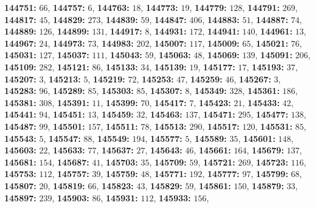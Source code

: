 \textsf{\bfseries 144751:} $66$, \textsf{\bfseries 144757:} $6$, \textsf{\bfseries 144763:} $18$, \textsf{\bfseries 144773:} $19$, \textsf{\bfseries 144779:} $128$, \textsf{\bfseries 144791:} $269$, \textsf{\bfseries 144817:} $45$, \textsf{\bfseries 144829:} $273$, \textsf{\bfseries 144839:} $59$, \textsf{\bfseries 144847:} $406$, \textsf{\bfseries 144883:} $51$, \textsf{\bfseries 144887:} $74$, \textsf{\bfseries 144889:} $126$, \textsf{\bfseries 144899:} $131$, \textsf{\bfseries 144917:} $8$, \textsf{\bfseries 144931:} $172$, \textsf{\bfseries 144941:} $140$, \textsf{\bfseries 144961:} $13$, \textsf{\bfseries 144967:} $24$, \textsf{\bfseries 144973:} $73$, \textsf{\bfseries 144983:} $202$, \textsf{\bfseries 145007:} $117$, \textsf{\bfseries 145009:} $65$, \textsf{\bfseries 145021:} $76$, \textsf{\bfseries 145031:} $127$, \textsf{\bfseries 145037:} $111$, \textsf{\bfseries 145043:} $59$, \textsf{\bfseries 145063:} $48$, \textsf{\bfseries 145069:} $139$, \textsf{\bfseries 145091:} $206$, \textsf{\bfseries 145109:} $282$, \textsf{\bfseries 145121:} $86$, \textsf{\bfseries 145133:} $34$, \textsf{\bfseries 145139:} $19$, \textsf{\bfseries 145177:} $17$, \textsf{\bfseries 145193:} $37$, \textsf{\bfseries 145207:} $3$, \textsf{\bfseries 145213:} $5$, \textsf{\bfseries 145219:} $72$, \textsf{\bfseries 145253:} $47$, \textsf{\bfseries 145259:} $46$, \textsf{\bfseries 145267:} $3$, \textsf{\bfseries 145283:} $96$, \textsf{\bfseries 145289:} $85$, \textsf{\bfseries 145303:} $85$, \textsf{\bfseries 145307:} $8$, \textsf{\bfseries 145349:} $328$, \textsf{\bfseries 145361:} $186$, \textsf{\bfseries 145381:} $308$, \textsf{\bfseries 145391:} $11$, \textsf{\bfseries 145399:} $70$, \textsf{\bfseries 145417:} $7$, \textsf{\bfseries 145423:} $21$, \textsf{\bfseries 145433:} $42$, \textsf{\bfseries 145441:} $94$, \textsf{\bfseries 145451:} $13$, \textsf{\bfseries 145459:} $32$, \textsf{\bfseries 145463:} $137$, \textsf{\bfseries 145471:} $295$, \textsf{\bfseries 145477:} $138$, \textsf{\bfseries 145487:} $99$, \textsf{\bfseries 145501:} $157$, \textsf{\bfseries 145511:} $78$, \textsf{\bfseries 145513:} $290$, \textsf{\bfseries 145517:} $120$, \textsf{\bfseries 145531:} $85$, \textsf{\bfseries 145543:} $5$, \textsf{\bfseries 145547:} $88$, \textsf{\bfseries 145549:} $194$, \textsf{\bfseries 145577:} $5$, \textsf{\bfseries 145589:} $35$, \textsf{\bfseries 145601:} $148$, \textsf{\bfseries 145603:} $22$, \textsf{\bfseries 145633:} $77$, \textsf{\bfseries 145637:} $27$, \textsf{\bfseries 145643:} $46$, \textsf{\bfseries 145661:} $164$, \textsf{\bfseries 145679:} $137$, \textsf{\bfseries 145681:} $154$, \textsf{\bfseries 145687:} $41$, \textsf{\bfseries 145703:} $35$, \textsf{\bfseries 145709:} $59$, \textsf{\bfseries 145721:} $269$, \textsf{\bfseries 145723:} $116$, \textsf{\bfseries 145753:} $112$, \textsf{\bfseries 145757:} $39$, \textsf{\bfseries 145759:} $48$, \textsf{\bfseries 145771:} $192$, \textsf{\bfseries 145777:} $97$, \textsf{\bfseries 145799:} $68$, \textsf{\bfseries 145807:} $20$, \textsf{\bfseries 145819:} $66$, \textsf{\bfseries 145823:} $43$, \textsf{\bfseries 145829:} $59$, \textsf{\bfseries 145861:} $150$, \textsf{\bfseries 145879:} $33$, \textsf{\bfseries 145897:} $239$, \textsf{\bfseries 145903:} $86$, \textsf{\bfseries 145931:} $112$, \textsf{\bfseries 145933:} $156$, 
